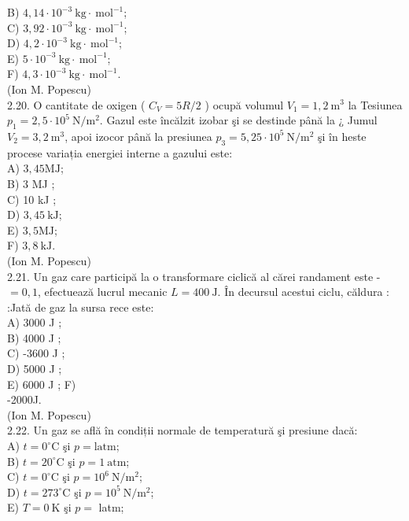 \documentclass[10pt]{article}
\begin{document}
B) $4,14 \cdot 10^{-3} \mathrm{~kg} \cdot \mathrm{~mol}^{-1}$;\\
C) $3,92 \cdot 10^{-3} \mathrm{~kg} \cdot \mathrm{~mol}^{-1}$;\\
D) $4,2 \cdot 10^{-3} \mathrm{~kg} \cdot \mathrm{~mol}^{-1}$;\\
E) $5 \cdot 10^{-3} \mathrm{~kg} \cdot \mathrm{~mol}^{-1}$;\\
F) $4,3 \cdot 10^{-3} \mathrm{~kg} \cdot \mathrm{~mol}^{-1}$.\\
(Ion M. Popescu)\\
2.20. O cantitate de oxigen ( $C_{V}=5 R / 2$ ) ocupă volumul $V_{1}=1,2 \mathrm{~m}^{3}$ la Tesiunea $p_{1}=2,5 \cdot 10^{5} \mathrm{~N} / \mathrm{m}^{2}$. Gazul este încălzit izobar şi se destinde până la ¿ Jumul $V_{2}=3,2 \mathrm{~m}^{3}$, apoi izocor până la presiunea $p_{3}=5,25 \cdot 10^{5} \mathrm{~N} / \mathrm{m}^{2}$ şi în heste procese variația energiei interne a gazului este:\\
A) $3,45 \mathrm{MJ}$;\\
B) 3 MJ ;\\
C) 10 kJ ;\\
D) $3,45 \mathrm{~kJ}$;\\
E) $3,5 \mathrm{MJ}$;\\
F) $3,8 \mathrm{~kJ}$.\\
(Ion M. Popescu)\\
2.21. Un gaz care participă la o transformare ciclică al cărei randament este - $=0,1$, efectuează lucrul mecanic $L=400 \mathrm{~J}$. În decursul acestui ciclu, căldura : :Jată de gaz la sursa rece este:\\
A) 3000 J ;\\
B) 4000 J ;\\
C) -3600 J ;\\
D) 5000 J ;\\
E) 6000 J ; F)\\
-2000J.\\
(Ion M. Popescu)\\
2.22. Un gaz se află în condiții normale de temperatură şi presiune dacă:\\
A) $t=0^{\circ} \mathrm{C}$ şi $p=\mathrm{latm}$;\\
B) $t=20^{\circ} \mathrm{C}$ şi $p=1 \mathrm{~atm}$;\\
C) $t=0^{\circ} \mathrm{C}$ şi $p=10^{6} \mathrm{~N} / \mathrm{m}^{2}$;\\
D) $t=273^{\circ} \mathrm{C}$ şi $p=10^{5} \mathrm{~N} / \mathrm{m}^{2}$;\\
E) $T=0 \mathrm{~K}$ şi $p=$ latm;\\
\end{document}
